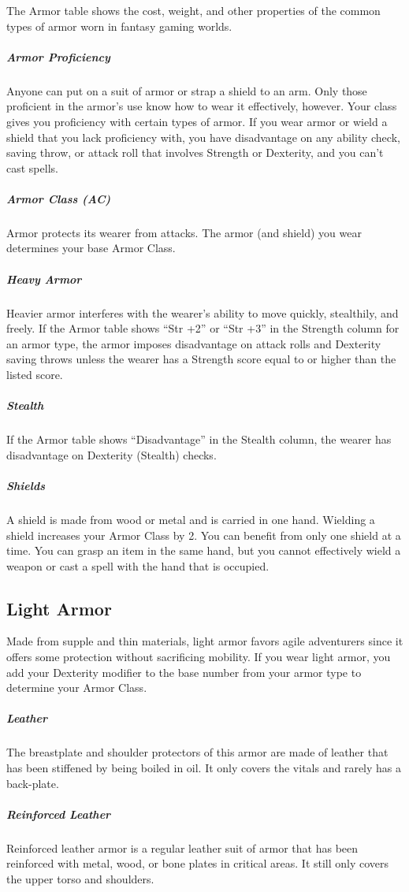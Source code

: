 The Armor table shows the cost, weight, and other properties of the common types of armor worn in fantasy gaming worlds.

\subparagraph*{Armor Proficiency} Anyone can put on a suit of armor or strap a shield to an arm. Only those proficient in the armor's use know how to wear it effectively, however. Your class gives you proficiency with certain types of armor. If you wear armor or wield a shield that you lack proficiency with, you have disadvantage on any ability check, saving throw, or attack roll that involves Strength or Dexterity, and you can't cast spells.

\subparagraph*{Armor Class (AC)} Armor protects its wearer from attacks. The armor (and shield) you wear determines your base Armor Class.

\subparagraph*{Heavy Armor} Heavier armor interferes with the wearer's ability to move quickly, stealthily, and freely. If the Armor table shows “Str +2” or “Str +3” in the Strength column for an armor type, the armor imposes disadvantage on attack rolls and Dexterity saving throws unless the wearer has a Strength score equal to or higher than the listed score.

\subparagraph*{Stealth} If the Armor table shows “Disadvantage” in the Stealth column, the wearer has disadvantage on Dexterity (Stealth) checks.

\subparagraph*{Shields} A shield is made from wood or metal and is carried in one hand. Wielding a shield increases your Armor Class by 2. You can benefit from only one shield at a time. You can grasp an item in the same hand, but you cannot effectively wield a weapon or cast a spell with the hand that is occupied.

\subsection{Light Armor}

Made from supple and thin materials, light armor favors agile adventurers since it offers some protection without sacrificing mobility. If you wear light armor, you add your Dexterity modifier to the base number from your armor type to determine your Armor Class.

\subparagraph*{Leather} The breastplate and shoulder protectors of this armor are made of leather that has been stiffened by being boiled in oil. It only covers the vitals and rarely has a back-plate.

\subparagraph*{Reinforced Leather} Reinforced leather armor is a regular leather suit of armor that has been reinforced with metal, wood, or bone plates in critical areas. It still only covers the upper torso and shoulders.

